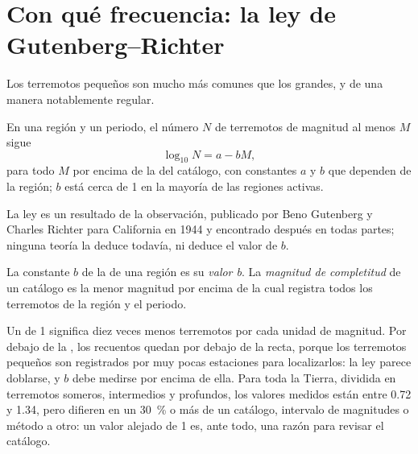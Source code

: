\section{Con qué frecuencia: la ley de Gutenberg--Richter}\label{sec:b1:earthquake-source:gr}

Los terremotos pequeños son mucho más comunes que los grandes, y de una manera notablemente regular.

\begin{proposition}\label{prop:b1:earthquake-source:gutenberg-richter}
En una región y un periodo, el número $N$ de terremotos de magnitud al menos
$M$ sigue
\[
  \log_{10} N = a - bM ,
\]
para todo $M$ por encima de la  del catálogo, con constantes $a$ y $b$ que dependen de la región; $b$ está cerca de 1 en
la mayoría de las regiones activas.
\end{proposition}
\admitted

La ley es un resultado de la observación, publicado por Beno Gutenberg y Charles Richter para California en 1944 y encontrado después en
todas partes; ninguna teoría la deduce todavía, ni deduce el valor de $b$.

\begin{definition}\label{def:b1:earthquake-source:b-value}
La constante $b$ de la  de una región es su
\emph{valor b}. La \emph{magnitud de
completitud} de un catálogo es la menor
magnitud por encima de la cual registra todos los terremotos de la región y el periodo.
\end{definition}

Un  de 1 significa diez veces menos terremotos por cada unidad de magnitud. Por debajo de la , los recuentos
quedan por debajo de la recta, porque los terremotos pequeños son registrados por muy pocas estaciones para localizarlos: la ley parece
doblarse, y $b$ debe medirse por encima de ella. Para toda la Tierra, dividida en terremotos someros, intermedios y profundos, los valores
medidos están entre 0.72 y 1.34, pero difieren en un \qty{30}{\percent} o más de un catálogo, intervalo de magnitudes o método a otro: un
valor alejado de 1 es, ante todo, una razón para revisar el catálogo.

